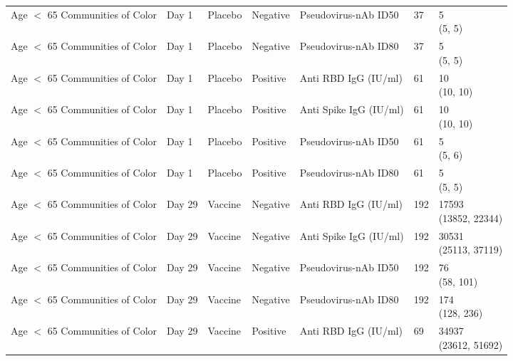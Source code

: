 \documentclass[]{book}
\theoremstyle{definition}
\theoremstyle{definition}
\theoremstyle{definition}
\newcommand{\1}{\mathbbm{1}}
\begin{document}
\begin{landscape}
\begin{ThreePartTable}
\begin{longtable}[t]{>{\raggedright\arraybackslash}p{7cm}llllll}
\hspace{1em}Age $<$ 65 Communities of Color & Day 1 & Placebo & Negative & Pseudovirus-nAb ID50 & 37 & \makecell[l]{5\\(5, 5)}\\
\hspace{1em}Age $<$ 65 Communities of Color & Day 1 & Placebo & Negative & Pseudovirus-nAb ID80 & 37 & \makecell[l]{5\\(5, 5)}\\
\hspace{1em}Age $<$ 65 Communities of Color & Day 1 & Placebo & Positive & Anti RBD IgG (IU/ml) & 61 & \makecell[l]{10\\(10, 10)}\\
\hspace{1em}Age $<$ 65 Communities of Color & Day 1 & Placebo & Positive & Anti Spike IgG (IU/ml) & 61 & \makecell[l]{10\\(10, 10)}\\
\hspace{1em}Age $<$ 65 Communities of Color & Day 1 & Placebo & Positive & Pseudovirus-nAb ID50 & 61 & \makecell[l]{5\\(5, 6)}\\
\hspace{1em}Age $<$ 65 Communities of Color & Day 1 & Placebo & Positive & Pseudovirus-nAb ID80 & 61 & \makecell[l]{5\\(5, 5)}\\
\hspace{1em}Age $<$ 65 Communities of Color & Day 29 & Vaccine & Negative & Anti RBD IgG (IU/ml) & 192 & \makecell[l]{17593\\(13852, 22344)}\\
\hspace{1em}Age $<$ 65 Communities of Color & Day 29 & Vaccine & Negative & Anti Spike IgG (IU/ml) & 192 & \makecell[l]{30531\\(25113, 37119)}\\
\hspace{1em}Age $<$ 65 Communities of Color & Day 29 & Vaccine & Negative & Pseudovirus-nAb ID50 & 192 & \makecell[l]{76\\(58, 101)}\\
\hspace{1em}Age $<$ 65 Communities of Color & Day 29 & Vaccine & Negative & Pseudovirus-nAb ID80 & 192 & \makecell[l]{174\\(128, 236)}\\
\hspace{1em}Age $<$ 65 Communities of Color & Day 29 & Vaccine & Positive & Anti RBD IgG (IU/ml) & 69 & \makecell[l]{34937\\(23612, 51692)}\\

\end{longtable}
\end{ThreePartTable}
\end{landscape}
\end{document}
